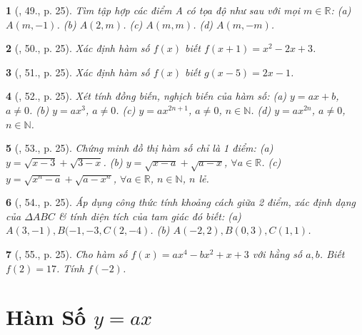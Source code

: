 \documentclass{article}
\newtheorem{baitoan}{}
\begin{document}
\begin{baitoan}[\cite{Binh_Toan_9_tap_1}, 49., p. 25]
	Tìm tập hợp các điểm A có tọa độ như sau với mọi $m\in\mathbb{R}$: (a) $A(m,-1)$. (b) $A(2,m)$. (c) $A(m,m)$. (d) $A(m,-m)$.
\end{baitoan}

\begin{baitoan}[\cite{Binh_Toan_9_tap_1}, 50., p. 25]
	Xác định hàm số $f(x)$ biết $f(x + 1) = x^2 - 2x + 3$.
\end{baitoan}

\begin{baitoan}[\cite{Binh_Toan_9_tap_1}, 51., p. 25]
	Xác định hàm số $f(x)$ biết $g(x - 5) = 2x - 1$.
\end{baitoan}

\begin{baitoan}[\cite{Binh_Toan_9_tap_1}, 52., p. 25]
	Xét tính đồng biến, nghịch biến của hàm số: (a) $y = ax + b$, $a\ne0$. (b) $y = ax^3$, $a\ne0$. (c) $y = ax^{2n + 1}$, $a\ne0$, $n\in\mathbb{N}$. (d) $y = ax^{2n}$, $a\ne0$, $n\in\mathbb{N}$.
\end{baitoan}

\begin{baitoan}[\cite{Binh_Toan_9_tap_1}, 53., p. 25]
	Chứng minh đồ thị hàm số chỉ là 1 điểm: (a) $y = \sqrt{x - 3} + \sqrt{3 - x}$. (b) $y = \sqrt{x - a} + \sqrt{a - x}$, $\forall a\in\mathbb{R}$. (c) $y = \sqrt{x^n - a} + \sqrt{a - x^n}$, $\forall a\in\mathbb{R}$, $n\in\mathbb{N}$, $n$ lẻ.
\end{baitoan}

\begin{baitoan}[\cite{Binh_Toan_9_tap_1}, 54., p. 25]
	Áp dụng công thức tính khoảng cách giữa 2 điểm, xác định dạng của $\Delta ABC$ \& tính diện tích của tam giác đó biết: (a) $A(3,-1),B(-1,-3,C(2,-4)$. (b) $A(-2,2),B(0,3),C(1,1)$.
\end{baitoan}

\begin{baitoan}[\cite{Binh_Toan_9_tap_1}, 55., p. 25]
	Cho hàm số $f(x) = ax^4 - bx^2 + x + 3$ với hằng số $a,b$. Biết $f(2) = 17$. Tính $f(-2)$.
\end{baitoan}


\section{Hàm Số $y = ax$}
\end{document}

